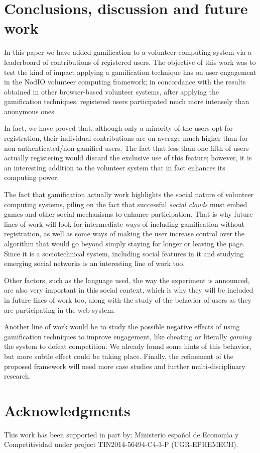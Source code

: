 \documentclass{llncs}
\begin{document}
\section{Conclusions, discussion and future work}

In this paper we have added gamification to a volunteer computing
system via a leaderboard of contributions of registered users. The objective of this work was to test the kind of impact
applying a gamification technique has on user engagement in
the {\sf NodIO}
volunteer computing framework; in concordance with
the results obtained in other
browser-based volunteer systems, after
applying the gamification techniques, registered users participated much more intensely than anonymous ones. 

In fact, we have proved that, although only a minority of the users opt
for registration, their individual contributions are on average much
higher than for non-authenticated/non-gamified users. The fact that less
than one fifth of users actually registering would discard the
exclusive use of this feature; however, it is an interesting addition
to the volunteer system that in fact enhances its computing power.

The fact that gamification actually work highlights the social nature of volunteer computing systems, piling on the fact that successful {\em social clouds} must embed games and other social mechanisms to enhance participation. That is why future lines of work will look for intermediate ways of including
gamification without registration, as well as some ways of making the
user increase control over the algorithm that would go beyond simply
staying for longer or leaving the page. Since it is a sociotechnical
system, including social features in it and studying emerging social
networks is an interesting line of work too.

Other factors, such as the language used, the way the experiment is
announced, are also very important in this social context, which is
why they will be included in future lines of work too, along with the
study of the behavior of users as they are participating
in the web system.

Another line of work would be to study the possible negative effects of using
gamification techniques to improve engagement, like cheating or
literally {\em gaming} the system to defeat competition. We already
found some hints of this behavior, but more subtle effect could be taking place.
Finally, the refinement of the proposed framework will need
more case studies and further multi-disciplinary research.


\section*{Acknowledgments}

This work has been supported in part by: Ministerio espa\~{n}ol de
 Econom\'{\i}a y Competitividad under project TIN2014-56494-C4-3-P
 (UGR-EPHEMECH).





\end{document}

